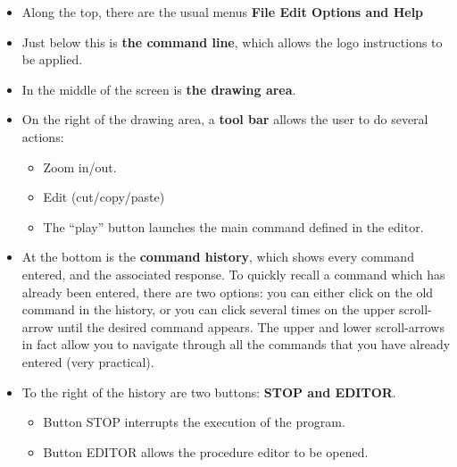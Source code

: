 \begin{itemize}
\item Along the top, there are the usual menus \textbf{File Edit Options and Help}
\item Just below this is \textbf{the command line}, which allows the logo instructions
to be applied.
\item In the middle of the screen is \textbf{the drawing area}. 
\item On the right of the drawing area, a\textbf{ tool bar} allows the user to do several actions:
\begin{itemize}
\item Zoom in/out.
\item Edit (cut/copy/paste)
\item The ``play'' button launches the main command defined in the editor.
\end{itemize}
\item At the bottom is the \textbf{command history}, which shows every command entered, and the associated response. To quickly recall a command which has already been entered, there are two options: you can either click on the old command in the history, or you can click several times
on the upper scroll-arrow until the desired command appears. The upper and lower scroll-arrows in fact allow you to navigate through all
the commands that you have already entered (very practical). 
\item To the right of the history are two buttons: \textbf{STOP and EDITOR}. 
\begin{itemize}
 \item Button STOP interrupts the execution of the program.
\item Button EDITOR allows the procedure editor to be opened.\\ 
\end{itemize}
\end{itemize}
